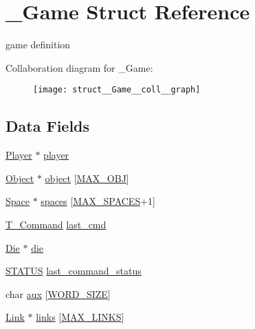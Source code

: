 \hypertarget{struct__Game}{}\section{\+\_\+\+Game Struct Reference}
\label{struct__Game}


game definition  




Collaboration diagram for \+\_\+\+Game\+:
\nopagebreak
\begin{figure}[H]
\begin{center}
\leavevmode
\texttt{[image: struct\_\_Game\_\_coll\_\_graph]}
\end{center}
\end{figure}
\subsection*{Data Fields}
\begin{DoxyCompactItemize}
\item 
\hyperlink{player_8h_af30e2030635a69690f85e48bc6ef202f}{Player} $\ast$ \hyperlink{struct__Game_a31406605782d71ec00c4bf258ea76267}{player}
\item 
\hyperlink{object_8h_a7f8bbcda919b65ce67f92fba08e0212f}{Object} $\ast$ \hyperlink{struct__Game_a805ef4ca82198bff524ed40d8ae867e7}{object} \mbox{[}\hyperlink{game_8h_a8e497c59a3362df6102c893a8498acd0}{M\+A\+X\+\_\+\+O\+BJ}\mbox{]}
\item 
\hyperlink{space_8h_a67533ffc2b70463baecc38fb0629bbfc}{Space} $\ast$ \hyperlink{struct__Game_ab4180417d9148f8abb2233ca6c4ecfe5}{spaces} \mbox{[}\hyperlink{space_8h_a5f54fd55f983a2e33ce076cd9f587e82}{M\+A\+X\+\_\+\+S\+P\+A\+C\+ES}+1\mbox{]}
\item 
\hyperlink{command_8h_a0473597db8c45c0289b6b8e2f8abbe32}{T\+\_\+\+Command} \hyperlink{struct__Game_a27727b50ea0904a1fe9e1c55c27f2cf1}{last\+\_\+cmd}
\item 
\hyperlink{die_8h_a892f0b0bf81d69a1f7a14ea238e36dd3}{Die} $\ast$ \hyperlink{struct__Game_a0d6009b5dcb080489c192a9198fa7d46}{die}
\item 
\hyperlink{types_8h_a32c27cc471df37f4fc818d65de0a56c4}{S\+T\+A\+T\+US} \hyperlink{struct__Game_ac553fd756c47abf8e7066c20f6b7dc82}{last\+\_\+command\+\_\+status}
\item 
char \hyperlink{struct__Game_a3aefc7ea654ec68acee732527bb660e8}{aux} \mbox{[}\hyperlink{types_8h_a92ed8507d1cd2331ad09275c5c4c1c89}{W\+O\+R\+D\+\_\+\+S\+I\+ZE}\mbox{]}
\item 
\hyperlink{link_8h_ae3b299941e67be6971bfd64a25505eff}{Link} $\ast$ \hyperlink{struct__Game_a2b766f0814f66dcf437600a9c526142e}{links} \mbox{[}\hyperlink{game_8h_a660ed1ec8604982002a0d6eced0e0367}{M\+A\+X\+\_\+\+L\+I\+N\+KS}\mbox{]}
\end{DoxyCompactItemize}


